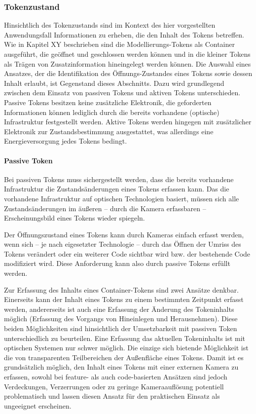 

\subsubsection{Tokenzustand} %
\label{ssub:tokenzustand}

Hinsichtlich des Tokenzustands sind im Kontext des hier vorgestellten Anwendungsfall Informationen zu erheben, die den Inhalt des Tokens betreffen. Wie in Kapitel XY beschrieben sind die Modellierungs-Tokens als Container ausgeführt, die geöffnet und geschlossen werden können und in die kleiner Tokens als Trägen von Zusatzinformation hineingelegt werden können. Die Auswahl eines Ansatzes, der die Identifikation des Öffnungs-Zustandes eines Tokens sowie dessen Inhalt erlaubt, ist Gegenstand dieses Abschnitts. Dazu wird grundlegend zwischen dem Einsatz von passiven Tokens und aktiven Tokens unterschieden. Passive Tokens besitzen keine zusätzliche Elektronik, die geforderten Informationen können lediglich durch die bereits vorhandene (optische) Infrastruktur festgestellt werden. Aktive Tokens werden hingegen mit zusätzlicher Elektronik zur Zustandsbestimmung ausgestattet, was allerdings eine Energieversorgung jedes Tokens bedingt.

\paragraph{Passive Token} %
\label{par:passive_token}
 
Bei passiven Tokens muss sichergestellt werden, dass die bereits vorhandene Infrastruktur die Zustandsänderungen eines Tokens erfassen kann. Das die vorhandene Infrastruktur auf optischen Technologien basiert, müssen sich alle Zustandsänderungen im äußeren -- durch die Kamera erfassbaren -- Erscheinungsbild eines Tokens wieder spiegeln.

Der Öffnungszustand eines Tokens kann durch Kameras einfach erfasst werden, wenn sich -- je nach eigesetzter Technologie -- durch das Öffnen der Umriss des Tokens verändert oder ein weiterer Code sichtbar wird bzw. der bestehende Code modifiziert wird. Diese Anforderung kann also durch passive Tokens erfüllt werden.

Zur Erfassung des Inhalts eines Container-Tokens sind zwei Ansätze denkbar. Einerseits kann der Inhalt eines Tokens zu einem bestimmten Zeitpunkt erfasst werden, andererseits ist auch eine Erfassung der Änderung des Tokeninhalts möglich (Erfassung des Vorgangs von Hineinlegen und Herausnehmen). Diese beiden Möglichkeiten sind hinsichtlich der Umsetzbarkeit mit passiven Token unterschiedlich zu beurteilen. Eine Erfassung das aktuellen Tokeninhalts ist mit optischen Systemen nur schwer möglich. Die einzige sich bietende Möglichkeit ist die von transparenten Teilbereichen der Außenfläche eines Tokens. Damit ist es grundsätzlich möglich, den Inhalt eines Tokens mit einer externen Kamera zu erfassen, sowohl bei feature- als auch code-basierten Ansätzen sind jedoch Verdeckungen, Verzerrungen oder zu geringe Kameraauflösung potentiell problematisch und lassen diesen Ansatz für den praktischen Einsatz als ungeeignet erscheinen.

